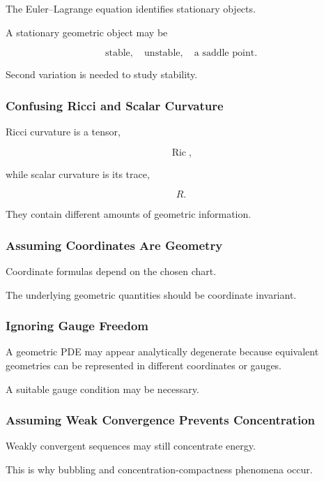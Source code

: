 The Euler--Lagrange equation identifies stationary objects.

A stationary geometric object may be

\[
\boxed{
\text{stable},
\quad
\text{unstable},
\quad
\text{a saddle point}.
}
\]

Second variation is needed to study stability.

\subsubsection{Confusing Ricci and Scalar Curvature}

Ricci curvature is a tensor,

\[
\operatorname{Ric},
\]

while scalar curvature is its trace,

\[
R.
\]

They contain different amounts of geometric information.

\subsubsection{Assuming Coordinates Are Geometry}

Coordinate formulas depend on the chosen chart.

The underlying geometric quantities should be coordinate invariant.

\subsubsection{Ignoring Gauge Freedom}

A geometric PDE may appear analytically degenerate because equivalent
geometries can be represented in different coordinates or gauges.

A suitable gauge condition may be necessary.

\subsubsection{Assuming Weak Convergence Prevents Concentration}

Weakly convergent sequences may still concentrate energy.

This is why bubbling and concentration-compactness phenomena occur.

